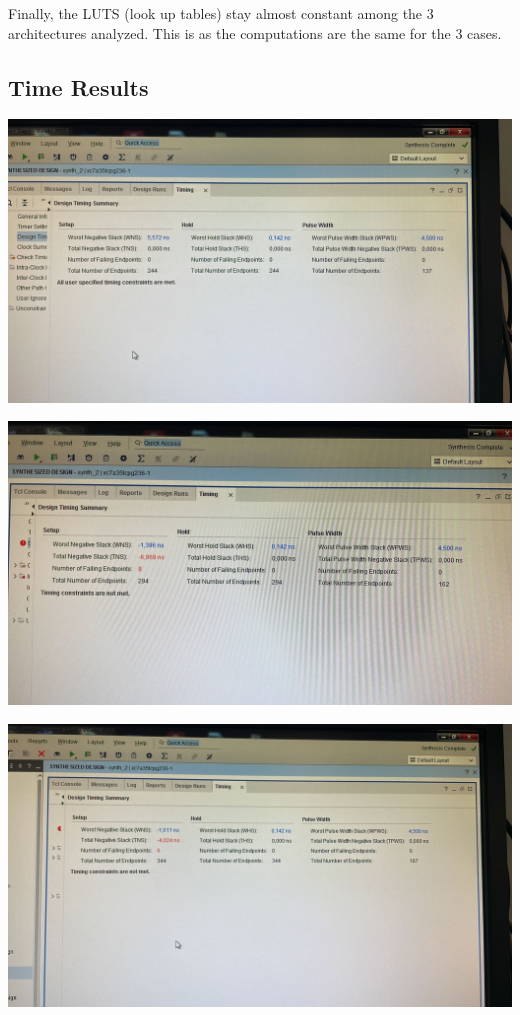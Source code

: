 \documentclass[a4paper, 12pt]{article}
\begin{document}
Finally, the LUTS (look up tables) stay almost constant among the 3 architectures analyzed. This is as the computations are the same for the 3 cases.
\subsection{Time Results}
\label{sec:orgd6ec97b}
\begin{center}
\includegraphics[width=.9\linewidth]{./img/time_report_parallel.jpg}
\end{center}

\begin{center}
\includegraphics[width=.9\linewidth]{./img/time_report_pipeline_simple.jpg}
\end{center}

\begin{center}
\includegraphics[width=.9\linewidth]{./img/time_report_pipeline.jpg}
\end{center}
\end{document}
